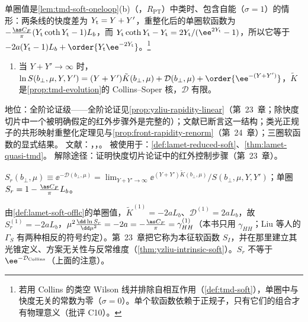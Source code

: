 单圈值是\cref{lem:tmd-soft-oneloop}(b)（\tagR，$R_{\mathrm{PT}}$）中类时、包含自能（$\sigma=1$）的情形：两条线的快度差为 $Y_{\rm t}=Y+Y'$，重整化后的单圈软函数为 $-\frac{\as C_F}\pi(Y_{\rm t}\coth Y_{\rm t}-1)L_b$，而 $Y_{\rm t}\coth Y_{\rm t}-Y_{\rm t}=2Y_{\rm t}/(\ee^{2Y_{\rm t}}-1)$，所以它等于 $-2a(Y_{\rm t}-1)L_b+\order{Y_{\rm t}\ee^{-2Y_{\rm t}}}$。\footnote{若用 Collins 的类空 Wilson 线并排除自相互作用（\cref{def:tmd-soft}），单圈中与快度无关的常数为零（$\sigma=0$）。单个软函数依赖于正规子，只有它们的组合才有物理意义（批评 C10）。}

\begin{assumption}\label{asm:lamet-soft-rapidity}
\begin{enumerate}[label=(SR),leftmargin=3.2em,itemsep=1pt,topsep=2pt]
\item 当 $Y+Y'\to\infty$ 时，$\ln S(b_\perp,\mu,Y,Y')=(Y+Y')\tilde K(b_\perp,\mu)+\mathcal D(b_\perp,\mu)+\order{\ee^{-(Y+Y')}}$，$\tilde K$ 是\cref{prop:tmd-evolution}的 Collins--Soper 核，$\mathcal D$ 有限。
\end{enumerate}
地位：全阶论证级——全阶论证见\cref{prop:yzliu-rapidity-linear}（第~23~章；除快度切片中一个被明确假定的红外步骤外是完整的）；文献\cite{CollinsSoper1981}已断言这一结构；类光正规子的共形映射重整化定理见\cite{Vladimirov:2017ksc}与\cref{prop:front-rapidity-renorm}（第~24~章）；三圈软函数的显式结果\cite{Li:2016axz}。
文献：\cite{Ji:2019sxk}，\cite[附录~E]{Liu:2022nnk}，\cite{CollinsSoper1981,Vladimirov:2017ksc,Li:2016axz}。
被使用于：\cref{def:lamet-reduced-soft}、\cref{thm:lamet-quasi-tmd}。
解除途径：证明快度切片论证中的红外控制步骤（第~23~章）。
\end{assumption}

\begin{definition}[约化软函数 $S_r$]\label{def:lamet-reduced-soft}
$S_r(b_\perp,\mu)\equiv\ee^{-\mathcal D(b_\perp,\mu)}=\lim_{Y+Y'\to\infty}\ee^{(Y+Y')\tilde K(b_\perp,\mu)}/S(b_\perp,\mu,Y,Y')$；单圈 $S_r=1-\frac{\as C_F}\pi L_b$。%
\end{definition}

由\cref{def:lamet-soft-offlc}的单圈值，$\tilde K^{(1)}=-2aL_b$、$\mathcal D^{(1)}=2aL_b$，故 $S_r^{(1)}=-2aL_b$，$\mu^2\frac{\dd\ln S_r}{\dd\mu^2}=-2a=-\frac{\as C_F}\pi=\gamma^{(1)}_{HH}$（本书只用 $\gamma_{HH}$；Liu 等人的 $\Gamma_S$ 有两种相反的符号约定）。第~23~章把它称为本征软函数 $S_I$，并在那里建立其光锥定义、方案无关性与反常维度（\cref{thm:yzliu-intrinsic-soft}）。$S_r$ 不等于 $\ee^{-\mathcal D_{\rm Collins}}$（上面的注意）。

